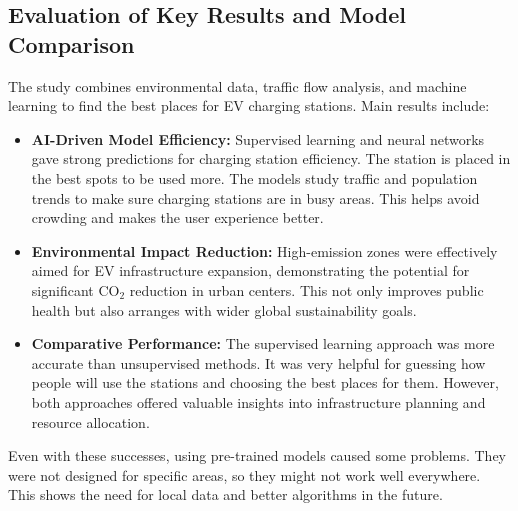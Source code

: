 \subsection{Evaluation of Key Results and Model Comparison}
The study combines environmental data, traffic flow analysis, and machine learning to find the best places for EV charging stations. Main results include:
\begin{itemize}
    \item \textbf{AI-Driven Model Efficiency:} Supervised learning and neural networks gave strong predictions for charging station efficiency. The station is placed in the best spots to be used more. The models study traffic and population trends to make sure charging stations are in busy areas. This helps avoid crowding and makes the user experience better.
\end{itemize}
\begin{itemize}
    \item \textbf{Environmental Impact Reduction:} High-emission zones were effectively aimed for EV infrastructure expansion, demonstrating the potential for significant $\text{CO}_2$ reduction in urban centers. This not only improves public health but also arranges with wider global sustainability goals.
\end{itemize} 
\begin{itemize}
    \item \textbf{Comparative Performance:} The supervised learning approach was more accurate than unsupervised methods. It was very helpful for guessing how people will use the stations and choosing the best places for them. However, both approaches offered valuable insights into infrastructure planning and resource allocation.
\end{itemize}
Even with these successes, using pre-trained models caused some problems. They were not designed for specific areas, so they might not work well everywhere. This shows the need for local data and better algorithms in the future.
